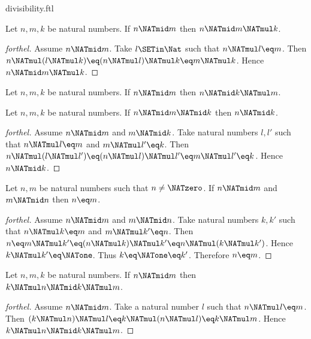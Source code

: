 \documentclass{naproche-library}
\begin{document}
\begin{smodule}[title=Divisibility]{divisibility.ftl}
\begin{proposition}[forthel,id=ARITHMETIC_07_7463519983239168]
  Let $n, m, k$ be natural numbers.
  If $n \NATmid m$ then $n \NATmid m \NATmul k$.
\end{proposition}
\begin{proof}[forthel]
  Assume $n \NATmid m$.
  Take $l \SETin \Nat$ such that $n \NATmul l \eq m$.
  Then $n \NATmul (l \NATmul k)
    \eq (n \NATmul l) \NATmul k
    \eq m \NATmul k$.
  Hence $n \NATmid m \NATmul k$.
\end{proof}

\begin{corollary}[forthel,id=ARITHMETIC_07_1588185794609152]
  Let $n, m, k$ be natural numbers.
  If $n \NATmid m$ then $n \NATmid k \NATmul m$.
\end{corollary}

\begin{proposition}[forthel,id=ARITHMETIC_07_7863858316181504]
  Let $n, m, k$ be natural numbers.
  If $n \NATmid m \NATmid k$ then $n \NATmid k$.
\end{proposition}
\begin{proof}[forthel]
  Assume $n \NATmid m$ and $m \NATmid k$.
  Take natural numbers $l,l'$ such that $n \NATmul l \eq m$ and $m \NATmul l' \eq k$.
  Then $n \NATmul (l \NATmul l')
    \eq (n \NATmul l) \NATmul l'
    \eq m \NATmul l'
    \eq k$.
  Hence $n \NATmid k$.
\end{proof}

\begin{proposition}[forthel,id=ARITHMETIC_07_4933275640397824]
  Let $n, m$ be natural numbers such that $n \neq \NATzero$.
  If $n \NATmid m$ and $m \NATmid n$ then $n \eq m$.
\end{proposition}
\begin{proof}[forthel]
  Assume $n \NATmid m$ and $m \NATmid n$.
  Take natural numbers $k,k'$ such that $n \NATmul k \eq m$ and $m \NATmul k' \eq n$.
  Then $n
    \eq m \NATmul k'
    \eq (n \NATmul k) \NATmul k'
    \eq n \NATmul (k \NATmul k')$.
  Hence $k \NATmul k' \eq \NATone$.
  Thus $k \eq \NATone \eq k'$.
  Therefore $n \eq m$.
\end{proof}

\begin{proposition}[forthel,id=ARITHMETIC_07_1283495225720832]
  Let $n, m, k$ be natural numbers.
  If $n \NATmid m$ then $k \NATmul n \NATmid k \NATmul m$.
\end{proposition}
\begin{proof}[forthel]
  Assume $n \NATmid m$.
  Take a natural number $l$ such that $n \NATmul l \eq m$.
  Then $(k \NATmul n) \NATmul l
    \eq k \NATmul (n \NATmul l)
    \eq k \NATmul m$.
  Hence $k \NATmul n \NATmid k \NATmul m$.
\end{proof}


\end{smodule}
\end{document}
